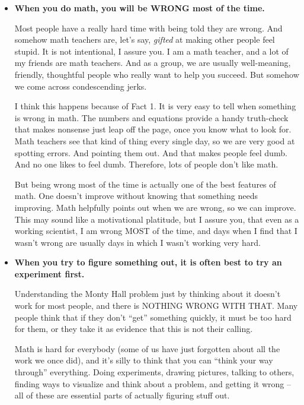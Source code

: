 \begin{itemize}
\item \textbf{When you do math, you will be WRONG most of the time.}

  Most people have a really hard time with being told they are wrong.
  And somehow math teachers are, let's say, \emph{gifted} at making
  other people feel stupid.  It is not intentional, I assure you.  I
  am a math teacher, and a lot of my friends are math teachers.  And
  as a group, we are usually well-meaning, friendly, thoughtful people
  who really want to help you succeed.  But somehow we come across
  condescending jerks.


  I think this happens because of Fact 1.  It is very easy to tell
  when something is wrong in math.  The numbers and equations provide
  a handy truth-check that makes nonsense just leap off the page, once
  you know what to look for.  Math teachers see that kind of thing
  every single day, so we are very good at spotting errors.  And
  pointing them out.  And that makes people feel dumb.  And no one
  likes to feel dumb.  Therefore, lots of people don't like math.


  But being wrong most of the time is actually one of the best
  features of math.  One doesn't improve without knowing that
  something needs improving.  Math helpfully points out when we are
  wrong, so we can improve.  This may sound like a motivational
  platitude, but I assure you, that even as a working scientist, I am
  wrong MOST of the time, and days when I find that I wasn't wrong are
  usually days in which I wasn't working very hard.


\item \textbf{When you try to figure something out, it is often best
    to try an experiment first.}  

  Understanding the Monty Hall problem just by thinking about it
  doesn't work for most people, and there is NOTHING WRONG WITH THAT.
  Many people think that if they don't ``get'' something quickly, it
  must be too hard for them, or they take it as evidence that this is
  not their calling.

  Math is hard for everybody (some of us have just forgotten about all
  the work we once did), and it's silly to think that you can ``think
  your way through'' everything.  Doing experiments, drawing pictures,
  talking to others, finding ways to visualize and think about a
  problem, and getting it wrong -- all of these are essential parts of
  actually figuring stuff out.


\end{itemize}
